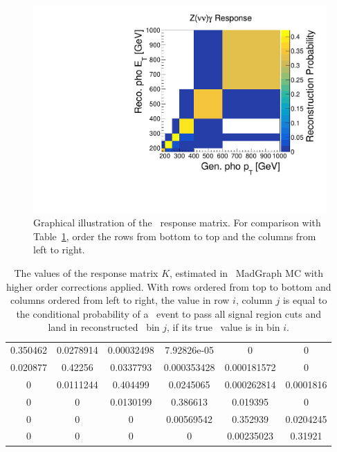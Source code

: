 \begin{figure}[htbp]
  \centering
  \includegraphics[width=0.6\linewidth]{Figures/znng_response_matrix.pdf}
  \caption{Graphical illustration of the \zinvg\ response matrix. For comparison with Table~\ref{tab:response_matrix_values},
  order the rows from bottom to top and the columns from left to right.}
  \label{fig:response_matrix}
\end{figure}

\begin{table}[tbp]
  \begin{center}
    \label{tab:response_matrix_values}
    \begin{tabular}{c c c c c c}
      \hline
       0.350462 & 0.0278914 & 0.00032498 & 7.92826e-05 & 0 & 0 \\
       0.020877 & 0.42256 & 0.0337793 & 0.000353428 & 0.000181572 & 0 \\
       0 & 0.0111244 & 0.404499 & 0.0245065 & 0.000262814 & 0.0001816 \\
       0 & 0 & 0.0130199 & 0.386613 & 0.019395 & 0 \\
       0 & 0 & 0 & 0.00569542 & 0.352939 & 0.0204245 \\
       0 & 0 & 0 & 0 & 0.00235023 & 0.31921 \\
      \hline
    \end{tabular}
    \caption{
      The values of the response matrix $K$, estimated in \zinvg\ MadGraph MC with higher order corrections applied.
      With rows ordered from top to bottom and columns ordered from left to right, the value in row $i$, column $j$
      is equal to the conditional probability of a \zinvg\ event to pass all signal region cuts and land in reconstructed
      \ETgamma\ bin $j$, if its true \pTgamma\ value is in bin $i$.
    }
  \end{center}
\end{table}

